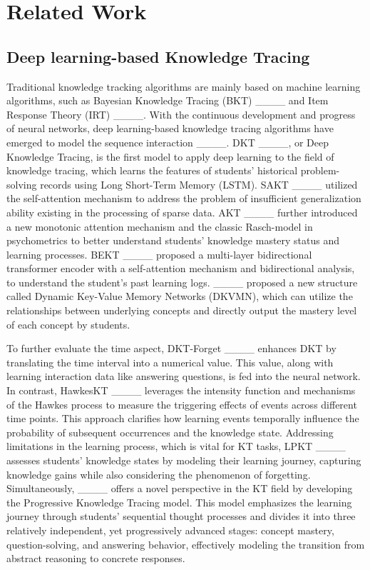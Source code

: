 \section{Related Work}
\label{sect:related work}
\subsection{Deep learning-based Knowledge Tracing}
Traditional knowledge tracking algorithms are mainly based on machine learning algorithms, such as Bayesian Knowledge Tracing (BKT) ____ and Item Response Theory (IRT) ____. 
With the continuous development and progress of neural networks, deep learning-based knowledge tracing algorithms have emerged to model the sequence interaction ____. 
DKT ____, or Deep Knowledge Tracing, is the first model to apply deep learning to the field of knowledge tracing, which learns the features of students' historical problem-solving records using Long Short-Term Memory (LSTM). 
SAKT ____ utilized the self-attention mechanism to address the problem of insufficient generalization ability existing in the processing of sparse data. 
AKT ____ further introduced a new monotonic attention mechanism and the classic Rasch-model in psychometrics to better understand students' knowledge mastery status and learning processes.
BEKT ____ proposed a multi-layer bidirectional transformer encoder with a self-attention mechanism and bidirectional analysis, to understand the student's past learning logs.
____ proposed a new structure called Dynamic Key-Value Memory Networks (DKVMN), which can utilize the relationships between underlying concepts and directly output the mastery level of each concept by students.  

To further evaluate the time aspect, DKT-Forget ____ enhances DKT by translating the time interval into a numerical value. This value, along with learning interaction data like answering questions, is fed into the neural network. In contrast, HawkesKT ____ leverages the intensity function and mechanisms of the Hawkes process to measure the triggering effects of events across different time points. This approach clarifies how learning events temporally influence the probability of subsequent occurrences and the knowledge state.
Addressing limitations in the learning process, which is vital for KT tasks, LPKT ____ assesses students’ knowledge states by modeling their learning journey, capturing knowledge gains while also considering the phenomenon of forgetting. Simultaneously, ____ offers a novel perspective in the KT field by developing the Progressive Knowledge Tracing model. This model emphasizes the learning journey through students’ sequential thought processes and divides it into three relatively independent, yet progressively advanced stages: concept mastery, question-solving, and answering behavior, effectively modeling the transition from abstract reasoning to concrete responses.

